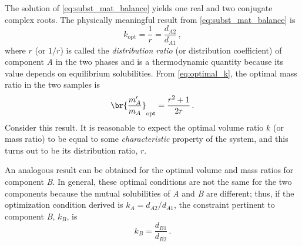 The solution of \cref{eq:subst_mat_balance} yields one real and two conjugate complex roots. 
The physically meaningful result from \cref{eq:subst_mat_balance} is 
\begin{equation}
  k_\text{opt} = \frac{1}{r} = \frac{d_{A2}}{d_{A1}} \, ,
  \label{eq:general_k_opt}
\end{equation}
where \(r\) (or \(1/r\)) is called the \emph{distribution ratio} (or distribution coefficient) of component \emph{A} in the two phases and is a thermodynamic quantity because its value depends on equilibrium solubilities. 
From \cref{eq:optimal_k}, the optimal mass ratio in the two samples is
\begin{equation}
  \br{\frac{m_A'}{m_A}}_\text{opt} = \frac{r^2 + 1}{2r} \, .
  \label{eq:opt_mass_ratio}
\end{equation}
Consider this result. 
It is reasonable to expect the optimal volume ratio \(k\) (or mass ratio) to be equal to some \emph{characteristic} property of the system, and this turns out to be its distribution ratio, \(r\).

An analogous result can be obtained for the optimal volume and mass ratios for component \emph{B}. 
In general, these optimal conditions are not the same for the two components because the mutual solubilities of \emph{A} and \emph{B} are different; thus, if the optimization condition derived is \(k_A = d_{A2}/d_{A1}\), the constraint pertinent to component \emph{B}, \(k_B\), is 
\begin{equation}
  k_B = \frac{d_{B1}}{d_{B2}} \, .
\end{equation}



